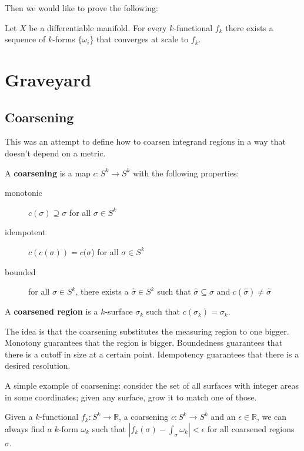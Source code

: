 \documentclass[10pt, onecolumn, longbibliography, nofootinbib]{revtex4-2}
\begin{document}
Then we would like to prove the following:

\begin{desid}
	Let $X$ be a differentiable manifold. For every $k$-functional $f_k$ there exists a sequence of $k$-forms $\{\omega_i$\} that converges at scale to $f_k$.
\end{desid}

\section{Graveyard}

\subsection{Coarsening}

This was an attempt to define how to coarsen integrand regions in a way that doesn't depend on a metric.

\begin{defn}
	A \textbf{coarsening} is a map $c : S^k \to S^k$ with the following properties:
	\begin{description}
		\item[monotonic] $c(\sigma) \supseteq \sigma$ for all $\sigma \in S^k$
		\item[idempotent] $c(c(\sigma)) = c(\sigma$) for all $\sigma \in S^k$
		\item[bounded] for all $\sigma \in S^k$, there exists a $\hat{\sigma} \in S^k$ such that $\hat{\sigma} \subseteq \sigma$ and $c(\hat{\sigma}) \neq \hat{\sigma}$
	\end{description}
	A \textbf{coarsened region} is a $k$-surface $\sigma_k$ such that $c(\sigma_k) = \sigma_k$. 
\end{defn}

\begin{remark}
	The idea is that the coarsening substitutes the measuring region to one bigger. Monotony guarantees that the region is bigger. Boundedness guarantees that there is a cutoff in size at a certain point. Idempotency guarantees that there is a desired resolution.
	
	A simple example of coarsening: consider the set of all surfaces with integer areas in some coordinates; given any surface, grow it to match one of those.
\end{remark}

\begin{desid}
	Given a $k$-functional $f_k : S^k \to \mathbb{R}$, a coarsening $c : S^k \to S^k$ and an $\epsilon \in \mathbb{R}$, we can always find a $k$-form $\omega_k$ such that $| f_k(\sigma) - \int_\sigma \omega_k | < \epsilon$ for all coarsened regions $\sigma$.
\end{desid}
\end{document}
